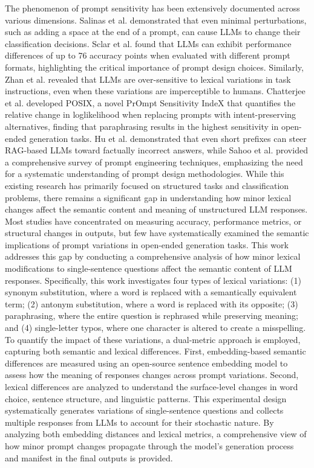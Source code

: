 \documentclass[a4paper,
               ]{jacow}
\begin{document}
The phenomenon of prompt sensitivity has been extensively documented across various dimensions. Salinas et al. \cite{salinas2024} demonstrated that even minimal perturbations, such as adding a space at the end of a prompt, can cause LLMs to change their classification decisions. Sclar et al. \cite{sclar2024} found that LLMs can exhibit performance differences of up to 76 accuracy points when evaluated with different prompt formats, highlighting the critical importance of prompt design choices. Similarly, Zhan et al. \cite{zhan2024} revealed that LLMs are over-sensitive to lexical variations in task instructions, even when these variations are imperceptible to humans. Chatterjee et al. \cite{chatterjee2024} developed POSIX, a novel PrOmpt Sensitivity IndeX that quantifies the relative change in loglikelihood when replacing prompts with intent-preserving alternatives, finding that paraphrasing results in the highest sensitivity in open-ended generation tasks. Hu et al. \cite{hu2024} demonstrated that even short prefixes can steer RAG-based LLMs toward factually incorrect answers, while Sahoo et al. \cite{sahoo2024} provided a comprehensive survey of prompt engineering techniques, emphasizing the need for a systematic understanding of prompt design methodologies. While this existing research has primarily focused on structured tasks and classification problems, there remains a significant gap in understanding how minor lexical changes affect the semantic content and meaning of unstructured LLM responses. Most studies have concentrated on measuring accuracy, performance metrics, or structural changes in outputs, but few have systematically examined the semantic implications of prompt variations in open-ended generation tasks.
This work addresses this gap by conducting a comprehensive analysis of how minor lexical modifications to single-sentence questions affect the semantic content of LLM responses. Specifically, this work investigates four types of lexical variations: (1) synonym substitution, where a word is replaced with a semantically equivalent term; (2) antonym substitution, where a word is replaced with its opposite; (3) paraphrasing, where the entire question is rephrased while preserving meaning; and (4) single-letter typos, where one character is altered to create a misspelling.
To quantify the impact of these variations, a dual-metric approach is employed, capturing both semantic and lexical differences. First, embedding-based semantic differences are measured using an open-source sentence embedding model to assess how the meaning of responses changes across prompt variations. Second, lexical differences are analyzed to understand the surface-level changes in word choice, sentence structure, and linguistic patterns. This experimental design systematically generates variations of single-sentence questions and collects multiple responses from LLMs to account for their stochastic nature. By analyzing both embedding distances and lexical metrics, a comprehensive view of how minor prompt changes propagate through the model's generation process and manifest in the final outputs is provided.
\end{document}
